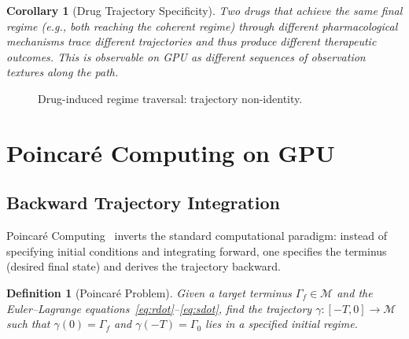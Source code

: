 \documentclass[11pt,twocolumn,a4paper]{article}
\newtheorem{corollary}[theorem]{Corollary}
\newtheorem{definition}[theorem]{Definition}
\begin{document}
\begin{corollary}[Drug Trajectory Specificity]
Two drugs that achieve the same final regime (e.g., both reaching the coherent regime) through different pharmacological mechanisms trace different trajectories and thus produce different therapeutic outcomes.
This is observable on GPU as different sequences of observation textures along the path.
\end{corollary}

\begin{figure}[t]
\centering
{}
\caption{Drug-induced regime traversal: trajectory non-identity.}
\label{fig:trajectories}
\end{figure}



\section{Poincar\'{e} Computing on GPU}
\label{sec:poincare}

\subsection{Backward Trajectory Integration}

Poincar\'{e} Computing~\cite{sachikonye2026operator,poincare1890} inverts the standard computational paradigm: instead of specifying initial conditions and integrating forward, one specifies the terminus (desired final state) and derives the trajectory backward.

\begin{definition}[Poincar\'{e} Problem]
\label{def:poincare}
Given a target terminus $\Gamma_f \in \mathcal{M}$ and the Euler--Lagrange equations~\eqref{eq:rdot}--\eqref{eq:sdot}, find the trajectory $\gamma : [-T, 0] \to \mathcal{M}$ such that $\gamma(0) = \Gamma_f$ and $\gamma(-T) = \Gamma_0$ lies in a specified initial regime.
\end{definition}
\end{document}
